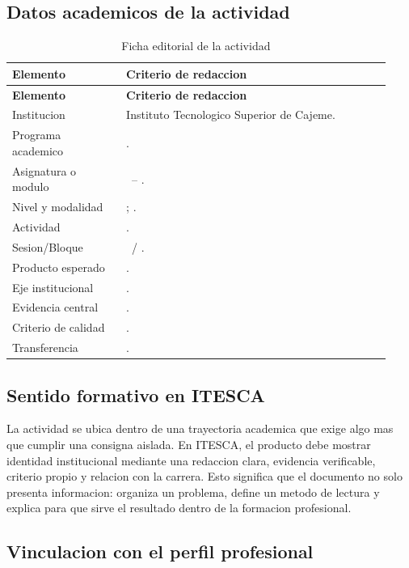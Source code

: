 \documentclass[
	spanish,
	letterpaper, oneside
]{article}
\def\universityname {Instituto Tecnologico Superior de Cajeme}
\begin{document}
\subsection{Datos academicos de la actividad}

\begin{longtable}{@{}p{0.28\linewidth}p{0.65\linewidth}@{}}
	\caption{Ficha editorial de la actividad}\label{tab:ficha-editorial-itesca}\\
	\toprule
	\textbf{Elemento} & \textbf{Criterio de redaccion} \\
	\midrule
	\endfirsthead
	\toprule
	\textbf{Elemento} & \textbf{Criterio de redaccion} \\
	\midrule
	\endhead
	Institucion & \universityname. \\
	Programa academico & \itescafaculty. \\
	Asignatura o modulo & \itescacoursecode\ -- \itescacoursename. \\
	Nivel y modalidad & \itescaprogramlevel; \itescamodality. \\
	Actividad & \itescaactivityname. \\
	Sesion/Bloque & \itescasessionname\ / \itescablockname. \\
	Producto esperado & \itescamainproduct. \\
	Eje institucional & \itescainstitutionalaxis. \\
	Evidencia central & \itescaevidencefocus. \\
	Criterio de calidad & \itescaqualitycriterion. \\
	Transferencia & \itescatransfercontext. \\
	\bottomrule
\end{longtable}

\subsection{Sentido formativo en ITESCA}

La actividad se ubica dentro de una trayectoria academica que exige algo mas
que cumplir una consigna aislada. En ITESCA, el producto debe mostrar identidad
institucional mediante una redaccion clara, evidencia verificable, criterio
propio y relacion con la carrera. Esto significa que el documento no solo
presenta informacion: organiza un problema, define un metodo de lectura y
explica para que sirve el resultado dentro de la formacion profesional.

\subsection{Vinculacion con el perfil profesional}
\end{document}
